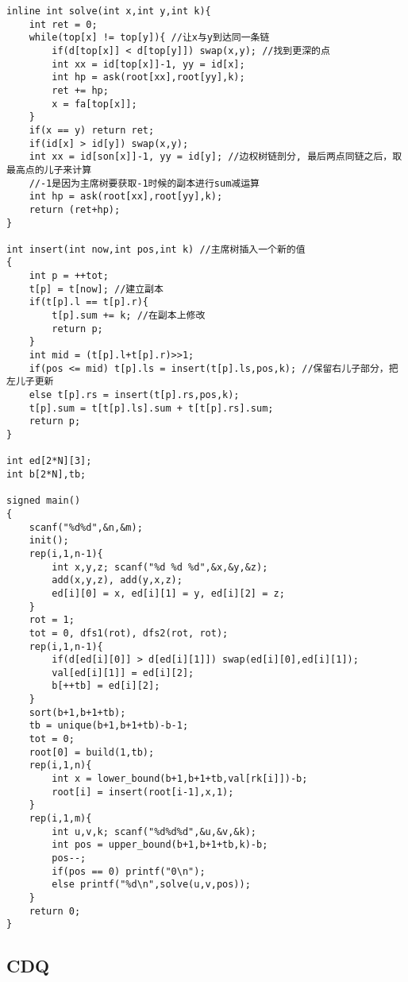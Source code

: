 \documentclass[twoside]{article}
\begin{document}
\begin{lstlisting}
inline int solve(int x,int y,int k){
	int ret = 0;
	while(top[x] != top[y]){ //让x与y到达同一条链
		if(d[top[x]] < d[top[y]]) swap(x,y); //找到更深的点
		int xx = id[top[x]]-1, yy = id[x];
		int hp = ask(root[xx],root[yy],k);
		ret += hp;
		x = fa[top[x]];
	}
	if(x == y) return ret;
	if(id[x] > id[y]) swap(x,y);
	int xx = id[son[x]]-1, yy = id[y]; //边权树链剖分, 最后两点同链之后，取最高点的儿子来计算
	//-1是因为主席树要获取-1时候的副本进行sum减运算
	int hp = ask(root[xx],root[yy],k);
	return (ret+hp);
}

int insert(int now,int pos,int k) //主席树插入一个新的值
{
	int p = ++tot;
	t[p] = t[now]; //建立副本
	if(t[p].l == t[p].r){
		t[p].sum += k; //在副本上修改
		return p;
	}
	int mid = (t[p].l+t[p].r)>>1;
	if(pos <= mid) t[p].ls = insert(t[p].ls,pos,k); //保留右儿子部分，把左儿子更新
	else t[p].rs = insert(t[p].rs,pos,k);
	t[p].sum = t[t[p].ls].sum + t[t[p].rs].sum;
	return p;
}

int ed[2*N][3];
int b[2*N],tb;

signed main()
{
	scanf("%d%d",&n,&m);
	init();
	rep(i,1,n-1){
		int x,y,z; scanf("%d %d %d",&x,&y,&z);
		add(x,y,z), add(y,x,z);
		ed[i][0] = x, ed[i][1] = y, ed[i][2] = z;
	}
	rot = 1;
	tot = 0, dfs1(rot), dfs2(rot, rot);
	rep(i,1,n-1){
		if(d[ed[i][0]] > d[ed[i][1]]) swap(ed[i][0],ed[i][1]);
		val[ed[i][1]] = ed[i][2];
		b[++tb] = ed[i][2];
	}	
	sort(b+1,b+1+tb);
	tb = unique(b+1,b+1+tb)-b-1;
	tot = 0;
	root[0] = build(1,tb);
	rep(i,1,n){
		int x = lower_bound(b+1,b+1+tb,val[rk[i]])-b;
		root[i] = insert(root[i-1],x,1);
	}
	rep(i,1,m){
		int u,v,k; scanf("%d%d%d",&u,&v,&k);
		int pos = upper_bound(b+1,b+1+tb,k)-b;
		pos--;
		if(pos == 0) printf("0\n");
		else printf("%d\n",solve(u,v,pos));
	}
	return 0;
}\end{lstlisting}
\subsection{CDQ}
\end{document}
